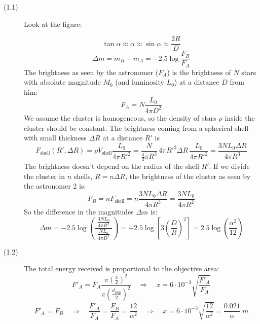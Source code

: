 \begin{description}
\item[(1.1)] Look at the figure:

\[
\tan\alpha \approx \alpha \approx \sin\alpha \approx \frac{2R}{D}
\]
\[
\Delta m = m_B - m_A = -2.5 \log\frac{F_B}{F_A}
\]
The brightness as seen by the astronomer ($F_A$) is the brightness of $N$
stars with absolute magnitude $M_0$ (and luminosity $L_0$) at a distance $D$
from him:
\[
F_A = N \frac{L_0}{4\pi D^2} \tag*{(4 pt)}
\]
We assume the cluster is homogeneous, so the density of stars $\rho$ inside
the cluster should be constant. The brightness coming from a spherical shell
with small thickness $\Delta R$ at a distance $R'$ is
\[
F_{\text{shell}}(R', \Delta R)
  = \rho V_{\text{shell}} \frac{L_0}{4\pi R'^2}
  = \frac{N}{\frac{4}{3}\pi R^3}\, 4\pi R'^2 \Delta R\, \frac{L_0}{4\pi R'^2}
  = \frac{3 N L_0 \Delta R}{4\pi R^3} \tag*{(5 pt)}
\]
The brightness doesn't depend on the radius of the shell $R'$. If we divide
the cluster in $n$ shells, $R = n \Delta R$, the brightness of the cluster as
seen by the astronomer 2 is: %
\[
F_B = n F_{\text{shell}} = n \frac{3 N L_0 \Delta R}{4\pi R^3}
    = \frac{3 N L_0}{4\pi R^2} \tag*{(4 pt)}
\]
So the difference in the magnitudes $\Delta m$ is:
\[
\Delta m = -2.5 \log\!\left(\frac{\;\frac{3NL_0}{4\pi R^2}\;}
                                 {\frac{NL_0}{4\pi D^2}}\right)
  = -2.5 \log\!\left[ 3 \left(\frac{D}{R}\right)^{\!2} \right]
  = 2.5 \log\!\left(\frac{\alpha^2}{12}\right) \tag*{(2 pt)}
\]

\item[(1.2)] The total energy received is proportional to the objective area:
\[
F'_A = F_A \frac{\pi \left(\frac{x}{2}\right)^2}
                {\pi \left(\frac{d_{\mathrm{pup}}}{2}\right)^2}
\quad\Rightarrow\quad
x = 6 \cdot 10^{-3} \sqrt{\frac{F'_A}{F_A}} \tag*{(3 pt)}
\]
\[
F'_A = F_B \quad\Rightarrow\quad
\frac{F'_A}{F_A} = \frac{F_B}{F_A} = \frac{12}{\alpha^2}
\quad\Rightarrow\quad
x = 6 \cdot 10^{-3} \sqrt{\frac{12}{\alpha^2}}
  = \frac{0.021}{\alpha}~m \tag*{(3 pt)}
\]


\end{description}
